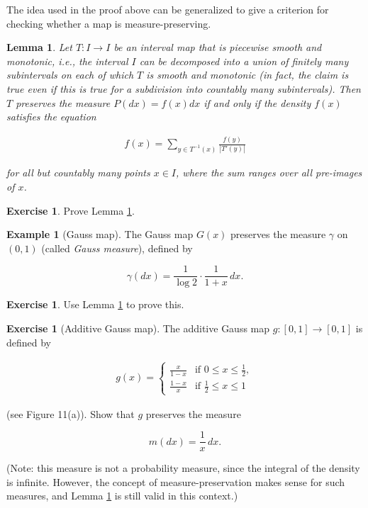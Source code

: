\documentclass[11pt]{report}
\theoremstyle{plain}
\newtheorem{lem}[thm]{Lemma}
\theoremstyle{definition}
\newtheorem{example}[thm]{Example}
\newtheorem{xexercise}[thm]{Exercise}
\begin{document}
The idea used in the proof above can be generalized
to give a criterion for checking whether a map is
measure-preserving.

\begin{lem}
\label{lem:measure-pres}
Let $T:I\to I$ be an interval map that is piecewise
smooth and monotonic, i.e., the interval $I$ can be
decomposed into a union of finitely many subintervals
on each of which $T$ is smooth and monotonic (in
fact, the claim is true even if this is true for a
subdivision into countably many subintervals). Then
$T$ preserves the measure $P(dx)=f(x)dx$ if and only
if the density $f(x)$ satisfies the equation

\begin{align*}
f(x) = \sum_{y\in T^{-1}(x)} \frac{f(y)}{|T'(y)|}
\end{align*}

for all but countably many points $x\in I$, where the
sum ranges over all pre-images of $x$.
\end{lem}

\begin{xexercise}
Prove Lemma \ref{lem:measure-pres}.
\end{xexercise}

\begin{example}[Gauss map]
The Gauss map $G(x)$ preserves the measure $\gamma$
on $(0,1)$ (called \emph{Gauss measure}), defined by

\[
\gamma(dx) = \frac{1}{\log 2}\cdot \frac{1}{1+x}\,dx.
\]

\end{example}

\begin{xexercise}
Use Lemma \ref{lem:measure-pres} to prove this.
\end{xexercise}

\begin{xexercise}[Additive Gauss map]
The additive Gauss map $g:[0,1]\to[0,1]$ is defined
by

\begin{align*}
g(x) = \begin{cases} \frac{x}{1-x} & \textrm{if }0\le x\le \tfrac12, \\
\frac{1-x}{x}&\textrm{if }\tfrac12\le x\le 1
\end{cases}
\end{align*}

(see Figure 11(a)). Show that $g$ preserves the
measure

\[
m(dx)=\frac{1}{x}\,dx.
\]

(Note: this measure is not a probability measure,
since the integral of the density is infinite.
However, the concept of measure-preservation makes
sense for such measures, and Lemma \ref{lem:measure-pres}
is still valid in this context.)
\end{xexercise}
\end{document}
